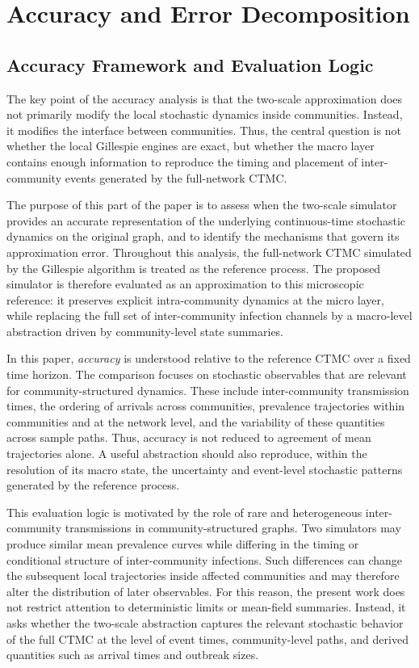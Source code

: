 \documentclass[a4paper,fleqn]{cas-sc}
\newcommand{\ReadStatusTwo}[5]{}
\begin{document}
\section{Accuracy and Error Decomposition}
\label{sec:accuracy_error}

\subsection{Accuracy Framework and Evaluation Logic}
\ReadStatusTwo{Accuracy Framework and Evaluation Logic}{Yulian}{1}{Michael}{0}

The key point of the accuracy analysis is that the two-scale approximation does not primarily modify the local stochastic dynamics inside communities. 
Instead, it modifies the interface between communities. 
Thus, the central question is not whether the local Gillespie engines are exact, but whether the macro layer contains enough information to reproduce the timing and placement of inter-community events generated by the full-network CTMC.

The purpose of this part of the paper is to assess when the two-scale simulator provides an accurate representation of the underlying continuous-time stochastic dynamics on the original graph, and to identify the mechanisms that govern its approximation error. Throughout this analysis, the full-network CTMC simulated by the Gillespie algorithm is treated as the reference process. The proposed simulator is therefore evaluated as an approximation to this microscopic reference: it preserves explicit intra-community dynamics at the micro layer, while replacing the full set of inter-community infection channels by a macro-level abstraction driven by community-level state summaries.

In this paper, \emph{accuracy} is understood relative to the reference CTMC over a fixed time horizon. The comparison focuses on stochastic observables that are relevant for community-structured dynamics. These include inter-community transmission times, the ordering of arrivals across communities, prevalence trajectories within communities and at the network level, and the variability of these quantities across sample paths. Thus, accuracy is not reduced to agreement of mean trajectories alone. A useful abstraction should also reproduce, within the resolution of its macro state, the uncertainty and event-level stochastic patterns generated by the reference process.

This evaluation logic is motivated by the role of rare and heterogeneous inter-community transmissions in community-structured graphs. Two simulators may produce similar mean prevalence curves while differing in the timing or conditional structure of inter-community infections. Such differences can change the subsequent local trajectories inside affected communities and may therefore alter the distribution of later observables. For this reason, the present work does not restrict attention to deterministic limits or mean-field summaries. Instead, it asks whether the two-scale abstraction captures the relevant stochastic behavior of the full CTMC at the level of event times, community-level paths, and derived quantities such as arrival times and outbreak sizes.
\end{document}
